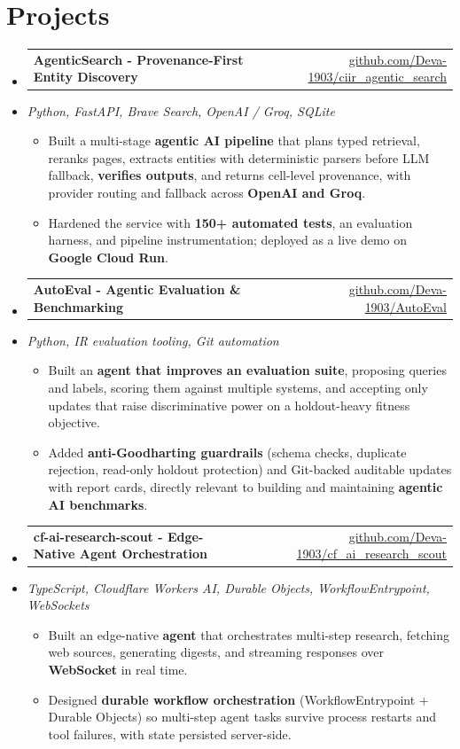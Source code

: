 \documentclass[letterpaper,10pt]{article}
\makeatletter
\newcommand{\resumeItem}[1]{
  \item\small{#1\vspace{-1pt}}
}
\newcommand{\resumeProjectHeading}[2]{
    \item
    \begin{tabular*}{0.985\textwidth}[t]{l@{\extracolsep{\fill}}r}
      \small\textbf{#1} & \small #2 \\
    \end{tabular*}\vspace{-5pt}
}
\newcommand{\resumeProjectSubheading}[1]{
  \vspace{-2pt}\item[] {\small\textcolor{ResumeSlate}{\emph{#1}}}\vspace{-3pt}
}
\newcommand{\resumeSubHeadingListStart}{\begin{itemize}[leftmargin=0.0in, label={}, itemsep=2pt, topsep=2pt]}
\newcommand{\resumeSubHeadingListEnd}{\end{itemize}}
\newcommand{\resumeItemListStart}{\begin{itemize}[leftmargin=0.18in, itemsep=2pt, topsep=1pt]}
\newcommand{\resumeItemListEnd}{\end{itemize}\vspace{-4pt}}
\makeatother
\begin{document}
\section{Projects}
\resumeSubHeadingListStart
  \resumeProjectHeading
    {AgenticSearch - Provenance-First Entity Discovery}
    {\href{https://github.com/Deva-1903/ciir_agentic_search}{github.com/Deva-1903/ciir\_agentic\_search}}
  \resumeProjectSubheading{Python, FastAPI, Brave Search, OpenAI / Groq, SQLite}
    \resumeItemListStart
      \resumeItem{Built a multi-stage \textbf{agentic AI pipeline} that plans typed retrieval, reranks pages, extracts entities with deterministic parsers before LLM fallback, \textbf{verifies outputs}, and returns cell-level provenance, with provider routing and fallback across \textbf{OpenAI and Groq}.}
      \resumeItem{Hardened the service with \textbf{150+ automated tests}, an evaluation harness, and pipeline instrumentation; deployed as a live demo on \textbf{Google Cloud Run}.}
    \resumeItemListEnd
  \resumeProjectHeading
    {AutoEval - Agentic Evaluation \& Benchmarking}
    {\href{https://github.com/Deva-1903/AutoEval}{github.com/Deva-1903/AutoEval}}
  \resumeProjectSubheading{Python, IR evaluation tooling, Git automation}
    \resumeItemListStart
      \resumeItem{Built an \textbf{agent that improves an evaluation suite}, proposing queries and labels, scoring them against multiple systems, and accepting only updates that raise discriminative power on a holdout-heavy fitness objective.}
      \resumeItem{Added \textbf{anti-Goodharting guardrails} (schema checks, duplicate rejection, read-only holdout protection) and Git-backed auditable updates with report cards, directly relevant to building and maintaining \textbf{agentic AI benchmarks}.}
    \resumeItemListEnd
  \resumeProjectHeading
    {cf-ai-research-scout - Edge-Native Agent Orchestration}
    {\href{https://github.com/Deva-1903/cf_ai_research_scout}{github.com/Deva-1903/cf\_ai\_research\_scout}}
  \resumeProjectSubheading{TypeScript, Cloudflare Workers AI, Durable Objects, WorkflowEntrypoint, WebSockets}
    \resumeItemListStart
      \resumeItem{Built an edge-native \textbf{agent} that orchestrates multi-step research, fetching web sources, generating digests, and streaming responses over \textbf{WebSocket} in real time.}
      \resumeItem{Designed \textbf{durable workflow orchestration} (WorkflowEntrypoint + Durable Objects) so multi-step agent tasks survive process restarts and tool failures, with state persisted server-side.}
    \resumeItemListEnd
\resumeSubHeadingListEnd
\vspace{-4pt}
\end{document}
